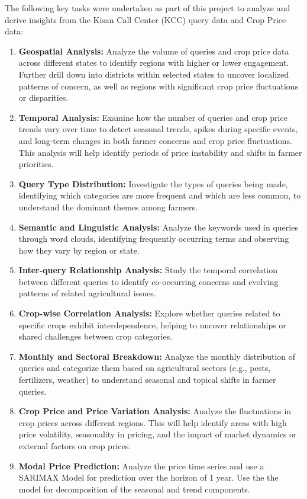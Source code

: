 \documentclass[a4paper, 12pt]{article}
\begin{document}
The following key tasks were undertaken as part of this project to analyze and derive insights from the Kisan Call Center (KCC) query data and Crop Price data:

\begin{enumerate}
\item \textbf{Geospatial Analysis:} Analyze the volume of queries and crop price data across different states to identify regions with higher or lower engagement. Further drill down into districts within selected states to uncover localized patterns of concern, as well as regions with significant crop price fluctuations or disparities.

\item \textbf{Temporal Analysis:} Examine how the number of queries and crop price trends vary over time to detect seasonal trends, spikes during specific events, and long-term changes in both farmer concerns and crop price fluctuations. This analysis will help identify periods of price instability and shifts in farmer priorities.


    \item \textbf{Query Type Distribution:} Investigate the types of queries being made, identifying which categories are more frequent and which are less common, to understand the dominant themes among farmers.

    \item \textbf{Semantic and Linguistic Analysis:} Analyze the keywords used in queries through word clouds, identifying frequently occurring terms and observing how they vary by region or state.

    \item \textbf{Inter-query Relationship Analysis:} Study the temporal correlation between different queries to identify co-occurring concerns and evolving patterns of related agricultural issues.

    \item \textbf{Crop-wise Correlation Analysis:} Explore whether queries related to specific crops exhibit interdependence, helping to uncover relationships or shared challenges between crop categories.

    \item \textbf{Monthly and Sectoral Breakdown:} Analyze the monthly distribution of queries and categorize them based on agricultural sectors (e.g., pests, fertilizers, weather) to understand seasonal and topical shifts in farmer queries.

    \item \textbf{Crop Price and Price Variation Analysis:} Analyze the fluctuations in crop prices across different regions. This will help identify areas with high price volatility, seasonality in pricing, and the impact of market dynamics or external factors on crop prices.

    \item \textbf{Modal Price Prediction:} Analyze the price time series and use a SARIMAX Model for prediction over the horizon of 1 year. Use the the model for decomposition of the seasonal and trend components.
    
\end{enumerate}
\end{document}

